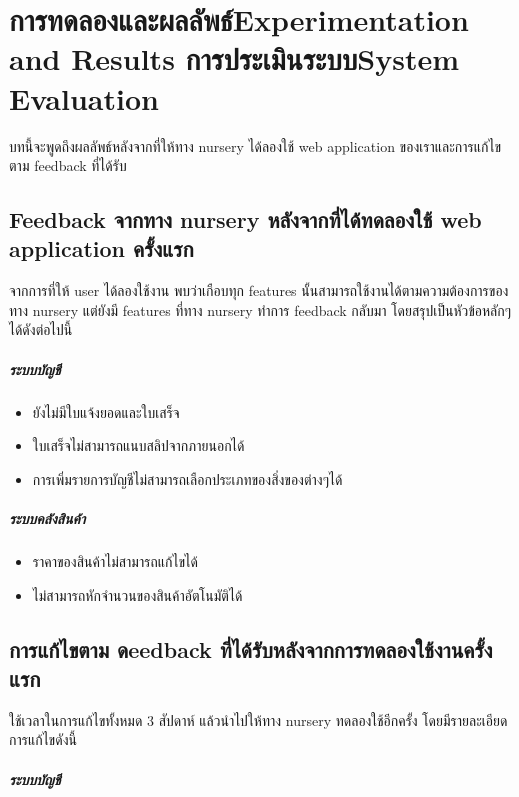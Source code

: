 \chapter{\ifproject%
\ifcpe การทดลองและผลลัพธ์\else Experimentation and Results\fi
\else%
\ifcpe การประเมินระบบ\else System Evaluation\fi
\fi}
บทนี้จะพูดถึงผลลัพธ์หลังจากที่ให้ทาง nursery ได้ลองใช้ web application ของเราและการแก้ไขตาม feedback ที่ได้รับ 
\section{Feedback จากทาง nursery หลังจากที่ได้ทดลองใช้ web application ครั้งแรก}
จากการที่ให้ user ได้ลองใช้งาน พบว่าเกือบทุก features นั้นสามารถใช้งานได้ตามความต้องการของทาง nursery แต่ยังมี features ที่ทาง nursery ทำการ feedback กลับมา โดยสรุปเป็นหัวข้อหลักๆ ได้ดังต่อไปนี้
\paragraph{ระบบบัญชี}
\begin{itemize}
    \item ยังไม่มีใบแจ้งยอดและใบเสร็จ
    \item ใบเสร็จไม่สามารถแนบสลิปจากภายนอกได้
    \item การเพิ่มรายการบัญชีไม่สามารถเลือกประเภทของสิ่งของต่างๆได้ 
\end{itemize}
\paragraph{ระบบคลังสินค้า}
\begin{itemize}
    \item ราคาของสินค้าไม่สามารถแก้ไขได้
    \item ไม่สามารถหักจำนวนของสินค้าอัตโนมัติได้
\end{itemize}

\section{การแก้ไขตาม ดeedback ที่ได้รับหลังจากการทดลองใช้งานครั้งแรก}
ใช้เวลาในการแก้ไขทั้งหมด 3 สัปดาห์ แล้วนำไปให้ทาง nursery ทดลองใช้อีกครั้ง โดยมีรายละเอียดการแก้ไขดังนี้
\paragraph{ระบบบัญชี}

